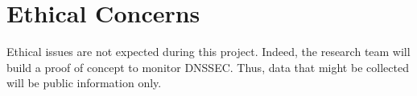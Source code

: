 \section{Ethical Concerns}
\label{chap:ethical_concerns}
Ethical issues are not expected during this project. Indeed, the research team will build a proof of concept to monitor DNSSEC. Thus, data that might be collected will be public information only.
